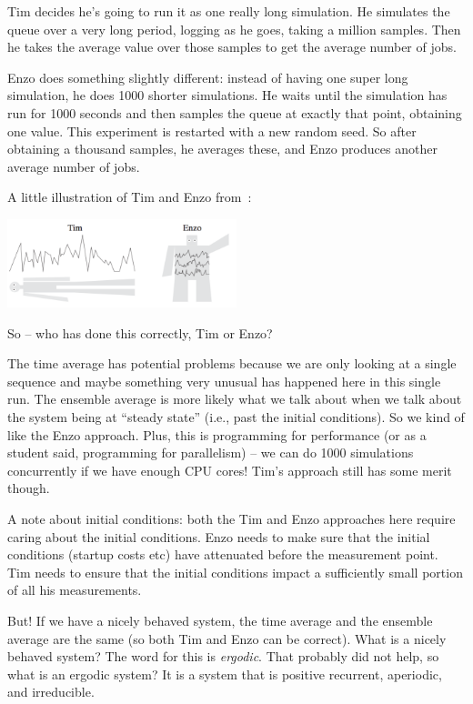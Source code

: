 Tim decides he's going to run it as one really long simulation. He simulates the queue over a very long period, logging as he goes, taking a million samples. Then he takes the average value over those samples to get the average number of jobs.

Enzo does something slightly different: instead of having one super long simulation, he does 1000 shorter simulations. He waits until the simulation has run for 1000 seconds and then samples the queue at exactly that point, obtaining one value. This experiment is restarted with a new random seed. So after obtaining a thousand samples, he averages these, and Enzo produces another average number of jobs.

A little illustration of Tim and Enzo from~\cite{pmd}:

\begin{center}
	\includegraphics[width=0.5\textwidth]{images/timenzo.png}
\end{center}

So -- who has done this correctly, Tim or Enzo?

The time average has potential problems because we are only looking at a single sequence and maybe something very unusual has happened here in this single run. The ensemble average is more likely what we talk about when we talk about the system being at ``steady state'' (i.e., past the initial conditions). So we kind of like the Enzo approach. Plus, this is programming for performance (or as a student said, programming for parallelism) -- we can do 1000 simulations concurrently if we have enough CPU cores! Tim's approach still has some merit though.

A note about initial conditions: both the Tim and Enzo approaches here require caring about the initial conditions. Enzo needs to make sure that the initial conditions (startup costs etc) have attenuated before the measurement point. Tim needs to ensure that the initial conditions impact a sufficiently small portion of all his measurements.

But! If we have a nicely behaved system, the time average and the ensemble average are the same (so both Tim and Enzo can be correct). What is a nicely behaved system? The word for this is \textit{ergodic}. That probably did not help, so what is an ergodic system? It is a system that is positive recurrent, aperiodic, and irreducible.

